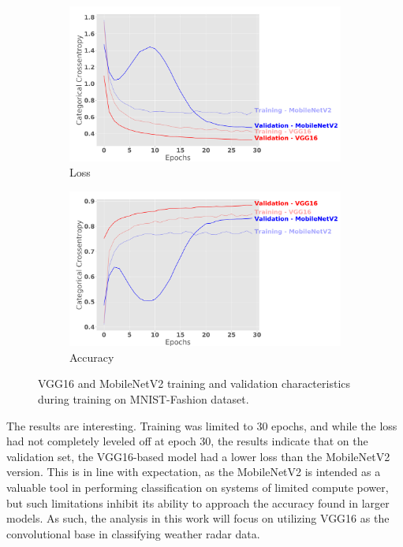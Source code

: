 \begin{figure}[h]
	\centering
	\begin{subfigure}[b]{\textwidth}
		\includegraphics[width=\textwidth]{./thesis_code/plots/train-val-loss_two-nets_three-channels-duplicated.png}
		\caption{Loss}
		\label{fig:classifying_conv_bases_loss}
	\end{subfigure}
	\begin{subfigure}[b]{\textwidth}
		\includegraphics[width=\textwidth]{./thesis_code/plots/train-val-acc_two-nets_three-channels-duplicated.png}
		\caption{Accuracy}
		\label{fig:classifying_conv_bases_accuracy}
	\end{subfigure}
	\caption{VGG16 and MobileNetV2 training and validation characteristics during training on MNIST-Fashion dataset.}
	\label{fig:classifying_conv_bases}
\end{figure}

The results are interesting. Training was limited to 30 epochs, and while the loss had not completely leveled off at epoch 30, the results indicate that on the validation set, the VGG16-based model had a lower loss than the MobileNetV2 version.
This is in line with expectation, as the MobileNetV2 is intended as a valuable tool in performing classification on systems of limited compute power, but such limitations inhibit its ability to approach the accuracy found in larger models.
As such, the analysis in this work will focus on utilizing VGG16 as the convolutional base in classifying weather radar data.

